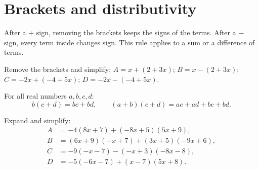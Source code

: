 \section{Brackets and distributivity}
\begin{method}
After a $+$ sign, removing the brackets keeps the signs of the terms. After a $-$ sign, every term inside changes sign. This rule applies to a sum or a difference of terms.
\end{method}
\begin{example}Remove the brackets and simplify: $A=x+(2+3x)$; $B=x-(2+3x)$; $C=-2x+(-4+5x)$; $D=-2x-(-4+5x)$.\end{example}
\begin{keypoint}[Distributivity]
For all real numbers $a,b,c,d$:
\[b(c+d)=bc+bd,\qquad(a+b)(c+d)=ac+ad+bc+bd.\]
\end{keypoint}
\begin{example}Expand and simplify:
\begin{align*}
A&=-4(8x+7)+(-8x+5)(5x+9),\\
B&=(6x+9)(-x+7)+(3x+5)(-9x+6),\\
C&=-9(-x-7)-(-x+3)(-8x-8),\\
D&=-5(-6x-7)+(x-7)(5x+8).
\end{align*}\end{example}

